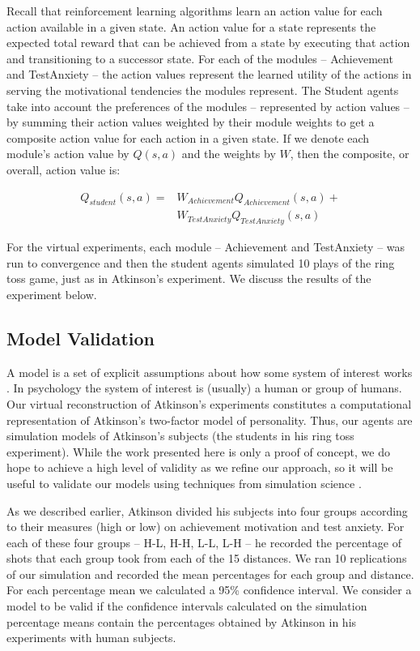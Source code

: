 Recall that reinforcement learning algorithms learn an action value for each action available in a given state.  An action value for a state represents the expected total reward that can be achieved from a state by executing that action and transitioning to a successor state. For each of the modules -- Achievement and TestAnxiety -- the action values represent the learned utility of the actions in serving the motivational tendencies the modules represent.  The Student agents take into account the preferences of the modules -- represented by action values -- by summing their action values weighted by their module weights to get a composite action value for each action in a given state.  If we denote each module's action value by $Q(s, a)$ and the weights by $W$, then the composite, or overall, action value is:

\begin{align}
Q_{student}(s,a) =  & W_{Achievement} Q_{Achievement}(s,a) +\\
                   & W_{TestAnxiety} Q_{TestAnxiety}(s,a)
\end{align}

For the virtual experiments, each module -- Achievement and TestAnxiety -- was run to convergence and then the student agents simulated 10 plays of the ring toss game, just as in Atkinson's experiment.  We discuss the results of the experiment below.

\subsection{Model Validation}

A model is a set of explicit assumptions about how some system of interest works \cite{law2007simulation}.  In psychology the system of interest is (usually) a human or group of humans.  Our virtual reconstruction of Atkinson's experiments constitutes a computational representation of Atkinson's two-factor model of personality.  Thus, our agents are simulation models of Atkinson's subjects (the students in his ring toss experiment).  While the work presented here is only a proof of concept, we do hope to achieve a high level of validity as we refine our approach, so it will be useful to validate our models using techniques from simulation science \cite{law2007simulation}.

As we described earlier, Atkinson divided his subjects into four groups according to their measures (high or low) on achievement motivation and test anxiety.  For each of these four groups -- H-L, H-H, L-L, L-H -- he recorded the percentage of shots that each group took from each of the 15 distances.  We ran 10 replications of our simulation and recorded the mean percentages for each group and distance.  For each percentage mean we calculated a 95\% confidence interval.  We consider a model to be valid if the confidence intervals calculated on the simulation percentage means contain the percentages obtained by Atkinson in his experiments with human subjects.

